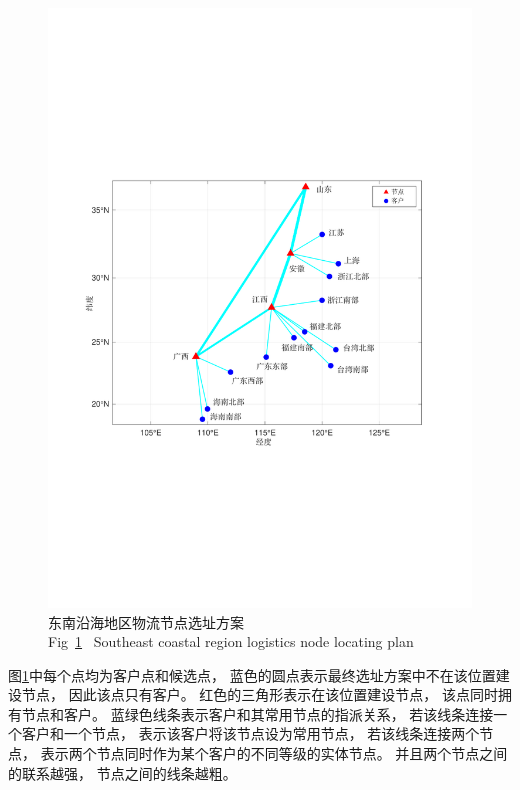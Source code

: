 \begin{figure}[!b] %
    \setlength{\belowcaptionskip}{-0.5cm} 
    \centering
    \includegraphics[height=0.4\textheight]{figures/case_location.pdf}
    \caption{东南沿海地区物流节点选址方案\\ Fig~\ref{fig:case_location}~ Southeast coastal region logistics node locating plan}
    \label{fig:case_location}
\end{figure}

图\ref{fig:case_location}中每个点均为客户点和候选点，
蓝色的圆点表示最终选址方案中不在该位置建设节点，
因此该点只有客户。
红色的三角形表示在该位置建设节点，
该点同时拥有节点和客户。
蓝绿色线条表示客户和其常用节点的指派关系，
若该线条连接一个客户和一个节点，
表示该客户将该节点设为常用节点，
若该线条连接两个节点，
表示两个节点同时作为某个客户的不同等级的实体节点。
并且两个节点之间的联系越强，
节点之间的线条越粗。

